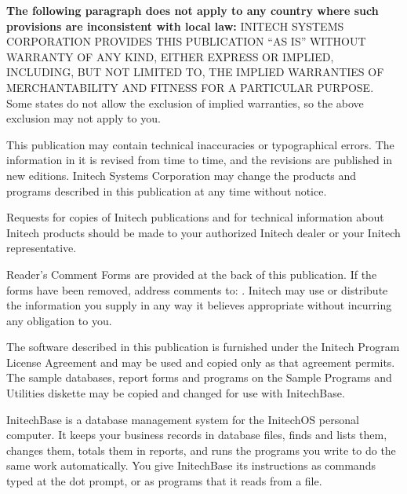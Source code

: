 \begin{TitleVerso}
{\imLegalFont
\textbf{The following paragraph does not apply to any country where such
provisions are inconsistent with local law:} INITECH SYSTEMS CORPORATION
PROVIDES THIS PUBLICATION ``AS IS'' WITHOUT WARRANTY OF ANY KIND, EITHER
EXPRESS OR IMPLIED, INCLUDING, BUT NOT LIMITED TO, THE IMPLIED WARRANTIES OF
MERCHANTABILITY AND FITNESS FOR A PARTICULAR PURPOSE.  Some states do not
allow the exclusion of implied warranties, so the above exclusion may not
apply to you.\par
This publication may contain technical inaccuracies or typographical errors.
The information in it is revised from time to time, and the revisions are
published in new editions.  Initech Systems Corporation may change the
products and programs described in this publication at any time without
notice.\par
Requests for copies of Initech publications and for technical information
about Initech products should be made to your authorized Initech dealer or
your Initech representative.\par}

{\footnotesize
Reader's Comment Forms are provided at the back of this publication.  If the
forms have been removed, address comments to: \InitechAddressLine.
Initech may use or distribute the information you supply in any way it
believes appropriate without incurring any obligation to you.\par
The software described in this publication is furnished under the Initech
Program License Agreement and may be used and copied only as that agreement
permits.  The sample databases, report forms and programs on the Sample
Programs and Utilities diskette may be copied and changed for use with
InitechBase.\par}
\IsThisGoodForTheCompany
\end{TitleVerso}

InitechBase\tm{} is a database management system for the InitechOS\tm{}
personal computer.  It keeps your business records in database files, finds
and lists them, changes them, totals them in reports, and runs the programs
you write to do the same work automatically.  You give InitechBase its
instructions as commands typed at the dot prompt, or as programs that it
reads from a file.

